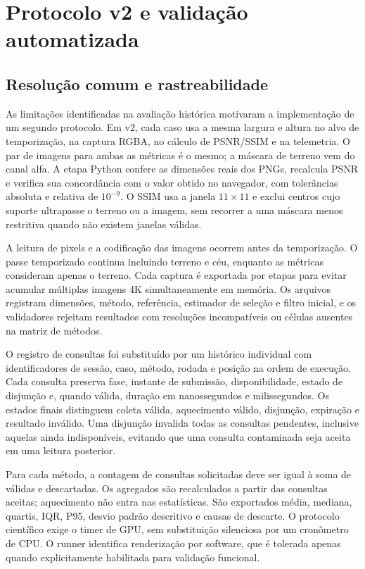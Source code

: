 \section{Protocolo v2 e validação automatizada}
\label{sec:v2}
\subsection{Resolução comum e rastreabilidade}
As limitações identificadas na avaliação histórica motivaram a implementação de um segundo protocolo. Em v2, cada caso usa a mesma largura e altura no alvo de temporização, na captura RGBA, no cálculo de PSNR/SSIM e na telemetria. O par de imagens para ambas as métricas é o mesmo; a máscara de terreno vem do canal alfa. A etapa Python confere as dimensões reais dos PNGs, recalcula PSNR e verifica sua concordância com o valor obtido no navegador, com tolerâncias absoluta e relativa de $10^{-9}$. O SSIM usa a janela $11\times11$ e exclui centros cujo suporte ultrapasse o terreno ou a imagem, sem recorrer a uma máscara menos restritiva quando não existem janelas válidas.

A leitura de pixels e a codificação das imagens ocorrem antes da temporização. O passe temporizado continua incluindo terreno e céu, enquanto as métricas consideram apenas o terreno. Cada captura é exportada por etapas para evitar acumular múltiplas imagens 4K simultaneamente em memória. Os arquivos registram dimensões, método, referência, estimador de seleção e filtro inicial, e os validadores rejeitam resultados com resoluções incompatíveis ou células ausentes na matriz de métodos.

O registro de consultas foi substituído por um histórico individual com identificadores de sessão, caso, método, rodada e posição na ordem de execução. Cada consulta preserva fase, instante de submissão, disponibilidade, estado de disjunção e, quando válida, duração em nanossegundos e milissegundos. Os estados finais distinguem coleta válida, aquecimento válido, disjunção, expiração e resultado inválido. Uma disjunção invalida todas as consultas pendentes, inclusive aquelas ainda indisponíveis, evitando que uma consulta contaminada seja aceita em uma leitura posterior.

Para cada método, a contagem de consultas solicitadas deve ser igual à soma de válidas e descartadas. Os agregados são recalculados a partir das consultas aceitas; aquecimento não entra nas estatísticas. São exportados média, mediana, quartis, IQR, P95, desvio padrão descritivo e causas de descarte. O protocolo científico exige o timer de GPU, sem substituição silenciosa por um cronômetro de CPU. O runner identifica renderização por software, que é tolerada apenas quando explicitamente habilitada para validação funcional.


